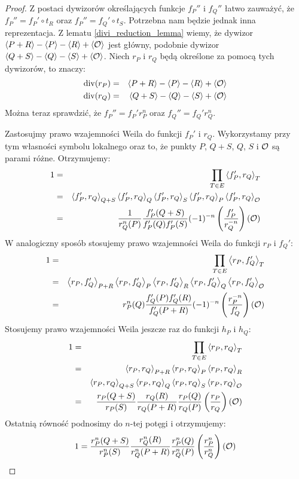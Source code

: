 \begin{proof}
Z postaci dywizorów określających funkcje $f_P''$ i $f_Q''$
łatwo zauważyć, że $f_P'' = f_P' \circ t_R$ oraz $f_P'' = f_Q' \circ t_S$.
Potrzebna nam będzie jednak inna reprezentacja.
Z lematu \ref{divi_reduction_lemma} wiemy,
że dywizor $\left\langle P+R\right\rangle - \left\langle P\right\rangle - \left\langle R\right\rangle + \left\langle\mathcal{O}\right\rangle$ jest główny,
podobnie dywizor $\left\langle Q+S\right\rangle - \left\langle Q\right\rangle - \left\langle S\right\rangle + \left\langle\mathcal{O}\right\rangle$.
Niech $r_P$ i $r_Q$ będą określone za pomocą tych dywizorów,
to znaczy:
\begin{eqnarray*}
\operatorname{div}(r_P) & = & \left\langle P+R\right\rangle - \left\langle P\right\rangle - \left\langle R\right\rangle + \left\langle\mathcal{O}\right\rangle \\
\operatorname{div}(r_Q) & = & \left\langle Q+S\right\rangle - \left\langle Q\right\rangle - \left\langle S\right\rangle + \left\langle\mathcal{O}\right\rangle
\end{eqnarray*}
Można teraz sprawdzić,
że $f_P'' = f_P'r_P^n$ oraz $f_Q'' = f_Q'r_Q^n$.

\noindent
Zastosujmy prawo wzajemności Weila do funkcji $f_P'$ i $r_Q$.
Wykorzystamy przy tym własności symbolu lokalnego
oraz to, że punkty $P$, $Q+S$, $Q$, $S$ i $\mathcal{O}$ są parami różne.
Otrzymujemy:
\begin{eqnarray}
1
& = & \prod_{T \in E} \left\langle f_P' , r_Q \right\rangle_{T}
\nonumber \\
& = & \left\langle f_P' , r_Q \right\rangle_{Q+S}\left\langle f_P' , r_Q \right\rangle_{Q}      \left\langle f_P' , r_Q \right\rangle_{S}
      \left\langle f_P' , r_Q \right\rangle_{P}  \left\langle f_P' , r_Q \right\rangle_{\mathcal{O}}
\nonumber \\
\label{reciprocity_1_eqn}
& = & \frac{1}{r_Q^n(P)}\frac{f_P'(Q+S)}{f_P'(Q)f_P'(S)}
      (-1)^{-n}\left(\frac{f_P'}{r_Q^{-n}}\right)(\mathcal{O})
\end{eqnarray}
W analogiczny sposób stosujemy prawo wzajemności Weila
do funkcji $r_P$ i $f_Q'$:
\begin{eqnarray}
1
& = & \prod_{T \in E} \left\langle r_P , f_Q' \right\rangle_{T}
\nonumber \\
& = & \left\langle r_P , f_Q' \right\rangle_{P+R}\left\langle r_P , f_Q' \right\rangle_{P}       \left\langle r_P , f_Q' \right\rangle_{R}
      \left\langle r_P , f_Q' \right\rangle_{Q}  \left\langle r_P , f_Q' \right\rangle_{\mathcal{O}}
\nonumber \\
\label{reciprocity_2_eqn}
& = & r_P^n(Q)\frac{f_Q'(P)f_Q'(R)}{f_Q'(P+R)}
      (-1)^{-n}\left(\frac{r_P^{-n}}{f_Q'}\right)(\mathcal{O})
\end{eqnarray}
Stosujemy prawo wzajemności Weila jeszcze raz do funkcji $h_P$ i $h_Q$:
\begin{eqnarray}
1
& = & \prod_{T \in E} \left\langle r_P , r_Q \right\rangle_{T}
\nonumber \\
& = & \left\langle r_P , r_Q \right\rangle_{P+R}
      \left\langle r_P , r_Q \right\rangle_{P}
      \left\langle r_P , r_Q \right\rangle_{R}
\nonumber \\
&   & \left\langle r_P , r_Q \right\rangle_{Q+S}
      \left\langle r_P , r_Q \right\rangle_{Q}
      \left\langle r_P , r_Q \right\rangle_{S}
      \left\langle r_P , r_Q \right\rangle_{\mathcal{O}}
\nonumber \\
& = & \frac{r_P(Q+S)}{r_P(S)}
      \frac{r_Q(R)}{r_Q(P+R)}
      \frac{r_P(Q)}{r_Q(P)}
      \left(\frac{r_P}{r_Q}\right)(\mathcal{O})
\end{eqnarray}
Ostatnią równość podnosimy do $n$-tej potęgi i otrzymujemy:
\begin{equation}\label{reciprocity_3_eqn}
1 =
\frac{r_P^n(Q+S)}{r_P^n(S)}
\frac{r_Q^n(R)}{r_Q^n(P+R)}
\frac{r_P^n(Q)}{r_Q^n(P)}
\left(\frac{r_P^n}{r_Q^n}\right)(\mathcal{O})
\end{equation}


\end{proof}
